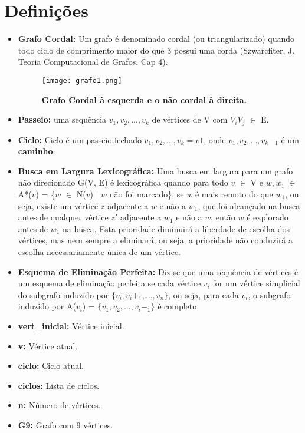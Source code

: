 \documentclass[a4paper, 11pt]{article}
\begin{document}
	\section{Definições}
		\begin{itemize}
			
			\item \textbf{Grafo Cordal:} Um grafo é denominado cordal (ou triangularizado) quando todo ciclo de comprimento maior do que 3 possui uma corda (Szwarcfiter, J. Teoria Computacional de Grafos. Cap 4). 
			
			\begin{figure}[H]
				\centering
					\texttt{[image: grafo1.png]}
				\caption{\textbf{Grafo Cordal à esquerda e o não cordal à direita.}}
			\end{figure}
			
			\item \textbf{Passeio:} uma sequência $v_1,v_2,...,v_k$ de vértices de V com $V_iV_j$ $\in$ E.
			
			\item \textbf{Ciclo:} Ciclo é um passeio fechado $v_1,v_2,...,v_k = v1$, onde $v_1,v_2,...,v_k-_1$ é um \textbf{caminho}.
			
			\item \textbf{Busca em Largura Lexicográfica:} Uma busca em largura para um grafo não direcionado G(V, E) é lexicográfica quando para todo $v$ $\in$ V e $w, w_1$ $\in$ A*($v$) = \{$w$ $\in$ N($v$) $\vert$ $w$ não foi marcado\}, se $w$ é mais remoto do que $w_1$, ou seja, existe um vértice $z$ adjacente a $w$ e não a $w_1$, que foi alcançado na busca antes de qualquer vértice $z'$ adjacente a $w_1$ e não a $w$; então $w$ é explorado antes de $w_1$ na busca. Esta prioridade diminuirá a liberdade de escolha dos vértices, mas nem sempre a eliminará, ou seja, a prioridade não conduzirá a escolha necessariamente única de um vértice.  
			
			\item \textbf{Esquema de Eliminação Perfeita:} Diz-se que uma sequência de vértices é um esquema de eliminação perfeita se cada vértice $v_i$ for um vértice simplicial do subgrafo induzido por $\{v_i, v_i+_1, …, v_n\} $, ou seja, para cada $v_i$, o subgrafo induzido por A($v_i$) = $\{v_1, v_2, …, v_i-_1\}$ é completo.
			
			\item \textbf{vert\_inicial:} Vértice inicial.
			\item \textbf{v:} Vértice atual.
			\item \textbf{ciclo:} Ciclo atual.
			\item \textbf{ciclos:} Lista de ciclos.
			\item \textbf{n:} Número de vértices.
			\item \textbf{G9:} Grafo com 9 vértices.
			
			
		\end{itemize}
\end{document}
